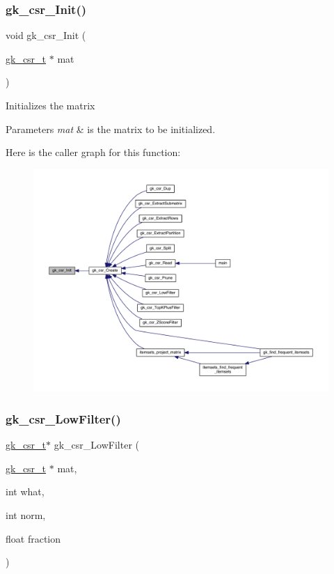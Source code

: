 \subsubsection{\texorpdfstring{gk\+\_\+csr\+\_\+\+Init()}{gk\_csr\_Init()}}
{\footnotesize\ttfamily void gk\+\_\+csr\+\_\+\+Init (\begin{DoxyParamCaption}\item[{\hyperlink{a00634}{gk\+\_\+csr\+\_\+t} $\ast$}]{mat }\end{DoxyParamCaption})}

Initializes the matrix 
\begin{DoxyParams}{Parameters}
{\em mat} & is the matrix to be initialized. \\
\hline
\end{DoxyParams}
Here is the caller graph for this function\+:\nopagebreak
\begin{figure}[H]
\begin{center}
\leavevmode
\includegraphics[width=350pt]{a00023_a47a303d88c3316bd821219cae39d0461_icgraph}
\end{center}
\end{figure}
\mbox{\label{a00023_a66729af11e7dee3585d6191661757c37}} 
\subsubsection{\texorpdfstring{gk\+\_\+csr\+\_\+\+Low\+Filter()}{gk\_csr\_LowFilter()}}
{\footnotesize\ttfamily \hyperlink{a00634}{gk\+\_\+csr\+\_\+t}$\ast$ gk\+\_\+csr\+\_\+\+Low\+Filter (\begin{DoxyParamCaption}\item[{\hyperlink{a00634}{gk\+\_\+csr\+\_\+t} $\ast$}]{mat,  }\item[{int}]{what,  }\item[{int}]{norm,  }\item[{float}]{fraction }\end{DoxyParamCaption})}


